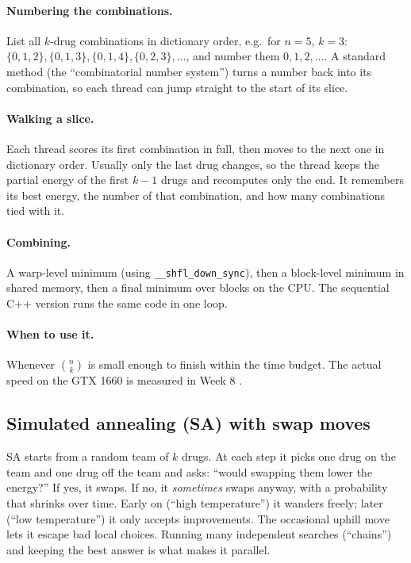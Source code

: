 \paragraph{Numbering the combinations.} List all $k$-drug combinations in dictionary order, e.g.\ for $n=5$, $k=3$: $\{0,1,2\},\{0,1,3\},\{0,1,4\},\{0,2,3\},\dots$, and number them $0,1,2,\dots$. A standard method (the ``combinatorial number system'') turns a number back into its combination, so each thread can jump straight to the start of its slice.

\paragraph{Walking a slice.} Each thread scores its first combination in full, then moves to the next one in dictionary order. Usually only the last drug changes, so the thread keeps the partial energy of the first $k-1$ drugs and recomputes only the end. It remembers its best energy, the number of that combination, and how many combinations tied with it.

\paragraph{Combining.} A warp-level minimum (using \texttt{\_\_shfl\_down\_sync}), then a block-level minimum in shared memory, then a final minimum over blocks on the CPU. The sequential C++ version runs the same code in one loop.

\paragraph{When to use it.} Whenever $\binom{n}{k}$ is small enough to finish within the time budget. The actual speed on the GTX 1660 is measured in Week 8 .

\subsection{Simulated annealing (SA) with swap moves}

\begin{plainwords}
SA starts from a random team of $k$ drugs. At each step it picks one drug on the team and one drug off the team and asks: ``would swapping them lower the energy?'' If yes, it swaps. If no, it \emph{sometimes} swaps anyway, with a probability that shrinks over time. Early on (``high temperature'') it wanders freely; later (``low temperature'') it only accepts improvements. The occasional uphill move lets it escape bad local choices. Running many independent searches (``chains'') and keeping the best answer is what makes it parallel.
\end{plainwords}

